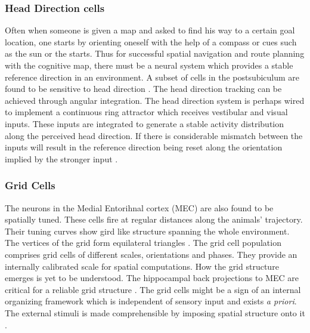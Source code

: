 \subsubsection{Head Direction cells}
Often when someone is given a map and asked to find his way to a certain goal location, one starts by orienting oneself with the help of a compass or cues such as the sun or the starts. Thus for successful spatial navigation and route planning with the cognitive map, there must be a neural system which provides a stable reference direction in an environment. A subset of cells in the postsubiculum  are found to be sensitive to head direction \cite{Taube1990}. The head direction tracking can be achieved through angular integration. The head direction system is perhaps wired to implement a continuous ring attractor which receives vestibular and visual inputs. These inputs are integrated to generate a stable activity distribution along the perceived head direction. If there is considerable mismatch between the inputs will result in the reference direction being reset along the orientation implied by the stronger input \cite{Valerio2012}. 

\subsubsection{Grid Cells}
The neurons in the Medial Entorihnal cortex (MEC) are also found to be spatially tuned. These cells fire at regular distances along the animals' trajectory. Their tuning curves show gird like structure spanning the whole environment. The vertices of the grid form equilateral triangles \cite{Hafting2005}. The grid cell population comprises grid cells of different scales, orientations and phases. They provide an internally  calibrated scale for spatial computations. How the grid structure emerges is yet to be understood. The hippocampal back projections to MEC are critical for a reliable grid structure \cite{Bonnevie2013}. The grid cells might be a sign of an internal organizing framework which is independent of sensory input and exists \emph{a priori}. The external stimuli is made comprehensible by imposing spatial structure onto it \cite{Kant2003}. 

